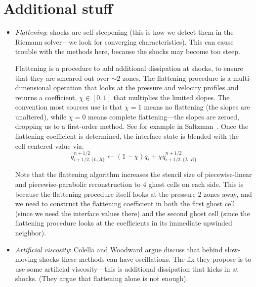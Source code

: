 \section{Additional stuff}

\begin{itemize}

\item {\em Flattening}: shocks are self-steepening (this is how we
  detect them in the Riemann solver---we look for converging characteristics).
  This can cause trouble with the methods here, because the shocks may become
  too steep.  

  Flattening is a procedure to add additional dissipation at shocks,
  to ensure that they are smeared out over $\sim 2$ zones.  The
  flattening procedure is a multi-dimensional operation that looks at
  the pressure and velocity profiles and returns a coefficient, $\chi
  \in [0,1]$ that multiplies the limited slopes.  The convention most
  sources use is that $\chi = 1$ means no flattening (the slopes are
  unaltered), while $\chi = 0$ means complete flattening---the slopes
  are zeroed, dropping us to a first-order method.
  See for example in Saltzman~\cite{saltzman:1994}.  Once the flattening
  coefficient is determined, the interface state is blended with the
  cell-centered value via:
  \begin{equation}
  q_{i+1/2,\{L,R\}}^{n+1/2} \leftarrow (1 - \chi) q_i + \chi q_{i+1/2,\{L,R\}}^{n+1/2}
  \end{equation}

  Note that the flattening algorithm increases the stencil size of
  piecewise-linear and piecewise-parabolic reconstruction to 4 ghost cells
  on each side.  This is because the flattening procedure itself looks
  at the pressure 2 zones away, and we need to construct the flattening
  coefficient in both the first ghost cell (since we need the interface
  values there) and the second ghost cell (since the flattening procedure
  looks at the coefficients in its immediate upwinded neighbor).

\item {\em Artificial viscosity}: Colella and Woodward argue discuss
  that behind slow-moving shocks these methods can have oscillations.
  The fix they propose is to use some artificial viscosity---this is
  additional dissipation that kicks in at shocks.  (They argue that
  flattening alone is not enough).  


\end{itemize}
